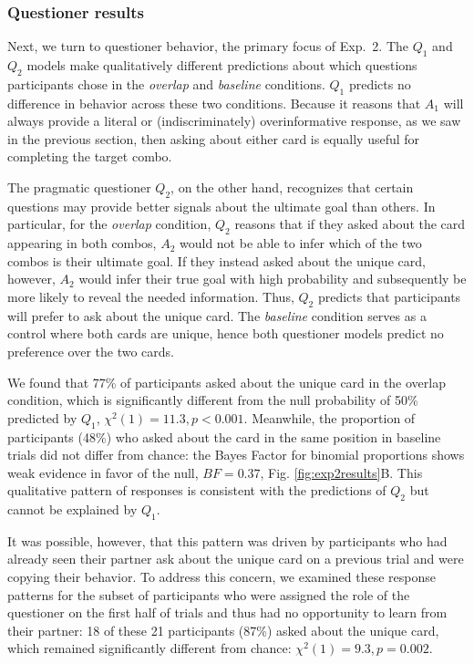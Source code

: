 \documentclass[11pt, floatsintext]{apa6}
\begin{document}
\subsubsection{Questioner results}

Next, we turn to questioner behavior, the primary focus of Exp.~2.
The $Q_1$ and $Q_2$ models make qualitatively different predictions about which questions participants chose in the \emph{overlap} and \emph{baseline} conditions.
$Q_1$ predicts no difference in behavior across these two conditions.
Because it reasons that $A_1$ will always provide a literal or (indiscriminately) overinformative response, as we saw in the previous section, then asking about either card is equally useful for completing the target combo.

The pragmatic questioner $Q_2$, on the other hand, recognizes that certain questions may provide better signals about the ultimate goal than others.
In particular, for the \emph{overlap} condition, $Q_2$ reasons that if they asked about the card appearing in both combos, $A_2$ would not be able to infer which of the two combos is their ultimate goal.
If they instead asked about the unique card, however, $A_2$ would infer their true goal with high probability and subsequently be more likely to reveal the needed information.
Thus, $Q_2$ predicts that participants will prefer to ask about the unique card.
The \emph{baseline} condition serves as a control where both cards are unique, hence both questioner models predict no preference over the two cards.

We found that 77\% of participants asked about the unique card in the overlap condition, which is significantly different from the null probability of 50\% predicted by $Q_1$, $\chi^2(1) = 11.3, p < 0.001$. 
Meanwhile, the proportion of participants (48\%) who asked about the card in the same position in baseline trials did not differ from chance: the Bayes Factor for binomial proportions  \cite{morey2016philosophy, morey2015package} shows weak evidence in favor of the null, $BF = 0.37$, Fig. \ref{fig:exp2results}B. 
This qualitative pattern of responses is consistent with the predictions of $Q_2$ but cannot be explained by $Q_1$.

It was possible, however, that this pattern was driven by participants who had already seen their partner ask about the unique card on a previous trial and were copying their behavior. 
To address this concern, we examined these response patterns for the subset of participants who were assigned the role of the questioner on the first half of trials and thus had no opportunity to learn from their partner: 18 of these 21 participants (87\%) asked about the unique card, which remained significantly different from chance: $\chi^2(1) = 9.3, p = 0.002$.
\end{document}
